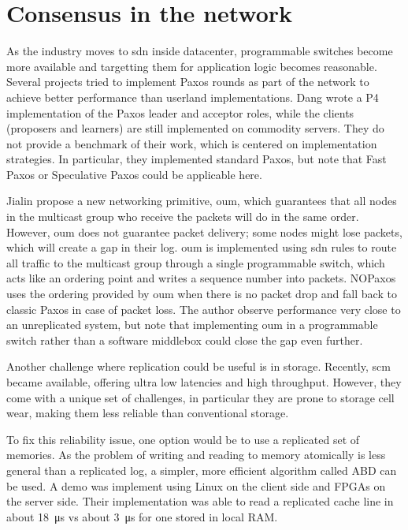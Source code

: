 \section{Consensus in the network}

As the industry moves to \gls{sdn} inside datacenter, programmable switches become more available and targetting them for application logic becomes reasonable.
Several projects tried to implement Paxos rounds as part of the network to achieve better performance than userland implementations.
Dang \etal wrote a P4 implementation of the Paxos leader and acceptor roles\cite{paxos_switchy}, while the clients (proposers and learners) are still implemented on commodity servers.
They do not provide a benchmark of their work, which is centered on implementation strategies.
In particular, they implemented standard Paxos, but note that Fast Paxos or Speculative Paxos could be applicable here.

Jialin \etal propose a new networking primitive, \gls{oum}, which guarantees that all nodes in the multicast group who receive the packets will do in the same order\cite{nopaxos}.
However, \gls{oum} does not guarantee packet delivery; some nodes might lose packets, which will create a gap in their log.
\Gls{oum} is implemented using \gls{sdn} rules to route all traffic to the multicast group through a single programmable switch, which acts like an ordering point and writes a sequence number into packets.
NOPaxos uses the ordering provided by \gls{oum} when there is no packet drop and fall back to classic Paxos in case of packet loss.
The author observe performance very close to an unreplicated system, but note that implementing \gls{oum} in a programmable switch rather than a software middlebox could close the gap even further.

Another challenge where replication could be useful is in storage.
Recently, \gls{scm} became available, offering ultra low latencies and high throughput.
However, they come with a unique set of challenges, in particular they are prone to storage cell wear, making them less reliable than conventional storage.

To fix this reliability issue, one option would be to use a replicated set of memories.
As the problem of writing and reading to memory atomically is less general than a replicated log, a simpler, more efficient algorithm called ABD\cite{abd} can be used.
A demo was implement using Linux on the client side and FPGAs on the server side\cite{consensus_memory}.
Their implementation was able to read a replicated cache line in about \SI{18}{\micro\second} vs about \SI{3}{\micro\second} for one stored in local RAM.
